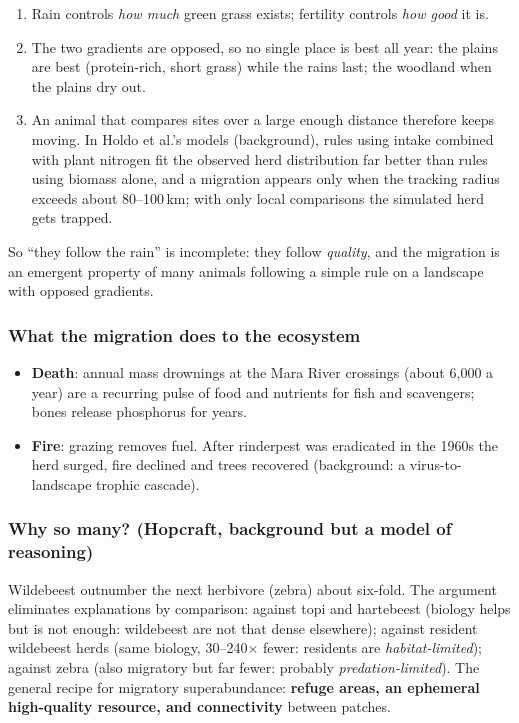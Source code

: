 \begin{chain}
\begin{enumerate}
\item Rain controls \emph{how much} green grass exists; fertility controls \emph{how good} it is.
\item The two gradients are opposed, so no single place is best all year: the plains are best (protein-rich, short
grass) while the rains last; the woodland when the plains dry out.
\item An animal that compares sites over a large enough distance therefore keeps moving. In Holdo et al.'s
models (background), rules using intake combined with plant nitrogen fit the observed herd distribution far better
than rules using biomass alone, and a migration appears only when the tracking radius exceeds about 80--100\,km;
with only local comparisons the simulated herd gets trapped.
\end{enumerate}
So ``they follow the rain'' is incomplete: they follow \emph{quality}, and the migration is an emergent property of
many animals following a simple rule on a landscape with opposed gradients.
\end{chain}

\subsubsection*{What the migration does to the ecosystem}
\begin{itemize}
\item \textbf{Death}: annual mass drownings at the Mara River crossings (about 6{,}000 a year) are a recurring pulse of
food and nutrients for fish and scavengers; bones release phosphorus for years.
\item \textbf{Fire}: grazing removes fuel. After rinderpest was eradicated in the 1960s the herd surged, fire
declined and trees recovered (background: a virus-to-landscape trophic cascade).
\end{itemize}

\subsubsection*{Why so many? (Hopcraft, background but a model of reasoning)}
Wildebeest outnumber the next herbivore (zebra) about six-fold. The argument eliminates explanations by comparison:
against topi and hartebeest (biology helps but is not enough: wildebeest are not that dense elsewhere); against
resident wildebeest herds (same biology, 30--240$\times$ fewer: residents are \emph{habitat-limited}); against zebra
(also migratory but far fewer: probably \emph{predation-limited}). The general recipe for migratory
superabundance: \textbf{refuge areas, an ephemeral high-quality resource, and connectivity} between patches.

